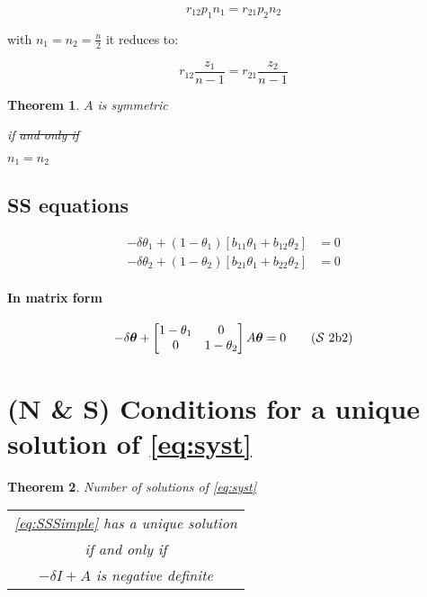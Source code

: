 \documentclass[12pt]{article}
\newcommand{\stkout}[1]{\ifmmode\text{\sout{\ensuremath{#1}}}\else\sout{#1}\fi}
\newtheorem{theorem}{Theorem}
\begin{document}
\begin{equation*}
r_{12} p_1 n_1 = r_{21} p_2 n_2
\end{equation*}

with $n_1 = n_2 = \frac{n}{2}$ it reduces to:

\[ r_{12} \frac{z_1}{n-1} = r_{21} \frac{z_2}{n-1} \]


\begin{theorem}
$A$ is symmetric 

if \stkout{and only if}

$n_1 = n_2$
\end{theorem}

\subsection{SS equations}

\[ \begin{split}
-\delta \theta_1 + (1-\theta_1) [b_{11} \theta_1 + b_{12} \theta_2 ] &  = 0 \\
-\delta \theta_2 + (1-\theta_2) [b_{21} \theta_1 + b_{22} \theta_2 ] & = 0 
\end{split} \]

\paragraph{In matrix form}

\begin{equation}
 -\delta \bm{\theta} + \begin{bmatrix} 1- \theta_1 & 0 \\ 0 & 1-\theta_2 \end{bmatrix} A \bm{\theta} = 0 
\label{eq:SSSimple}
\tag{$\mathcal{S}$ 2b2}
\end{equation}

\section{(N \& S) Conditions for a unique solution of \eqref{eq:syst}}

\begin{theorem} Number of solutions of \eqref{eq:syst}
 \begin{center}
\begin{tabular}{c}
\eqref{eq:SSSimple} has a unique solution \\
if and only if \\
$-\delta I + A$ is negative definite \end{tabular} \end{center}
\end{theorem}
\end{document}
